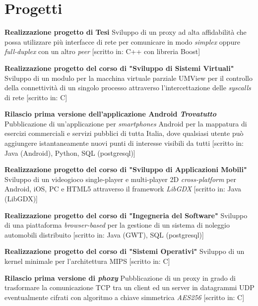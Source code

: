 \documentclass[11pt,a4paper]{moderncv}
\begin{document}

\section{Progetti}
 {\textbf{Realizzazione progetto di Tesi} \cite{progettotesi}\newline Sviluppo di un proxy ad alta affidabilità che possa utilizzare più interfacce di rete per comunicare in modo {\em simplex} oppure {\em full-duplex} con un altro {\em peer} [scritto in: C++ con libreria Boost]}

 {\textbf{Realizzazione progetto del corso di "Sviluppo di Sistemi Virtuali"} \cite{vsd}\newline Sviluppo di un modulo per la macchina virtuale parziale UMView per il controllo della connettività di un singolo processo attraverso l'intercettazione delle {\em syscalls} di rete [scritto in: C]}

 {\textbf{Rilascio prima versione dell'applicazione Android {\em Trovatutto}} \cite{trovatutto} \newline Pubblicazione di un'applicazione per {\em smartphones} Android per la mappatura di esercizi commerciali e servizi pubblici di tutta Italia, dove qualsiasi utente può aggiungere istantaneamente nuovi punti di interesse visibili da tutti [scritto in: Java (Android), Python, SQL (postgresql)]}

 {\textbf{Realizzazione progetto del corso di "Sviluppo di Applicazioni Mobili"} \cite{shuttle}\newline Sviluppo di un videogioco single-player e multi-player 2D {\em cross-platform} per Android, iOS, PC e HTML5 attraverso il framework {\em LibGDX} [scritto in: Java (LibGDX)]}

 {\textbf{Realizzazione progetto del corso di "Ingegneria del Software"} \cite{lis}\newline Sviluppo di una piattaforma {\em browser-based} per la gestione di un sistema di noleggio automobili distribuito [scritto in: Java (GWT), SQL (postgresql)]}

 {\textbf{Realizzazione progetto del corso di "Sistemi Operativi"} \cite{so}\newline Sviluppo di un kernel minimale per l'architettura MIPS [scritto in: C]}

 {\textbf{Rilascio prima versione di {\em phoxy}} \cite{phoxy}\newline Pubblicazione di un proxy in grado di trasformare la comunicazione TCP tra un client ed un server in datagrammi UDP eventualmente cifrati con algoritmo a chiave simmetrica {\em AES256} [scritto in: C]}
\end{document}
